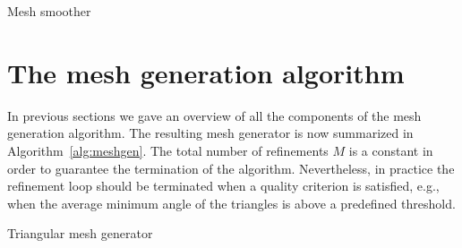 \documentclass[11pt]{article}
\begin{document}

\begin{algorithm}[H]
  \caption{Mesh smoother}
  \begin{algorithmic}[1]
    \Statex
    \EndFor
    \State {}
    \EndFunction
  \end{algorithmic}
\end{algorithm}

\section{The mesh generation algorithm}
\label{sec:orgff9b6c1}

In previous sections we gave an overview of all the components of the mesh
generation algorithm.  The resulting mesh generator is now summarized in
Algorithm~\ref{alg:meshgen}.  The total number of refinements $M$ is a constant
in order to guarantee the termination of the algorithm.  Nevertheless, in practice
the refinement loop should be terminated when a quality criterion is
satisfied, e.g., when the average minimum angle of the triangles
is above a predefined threshold.

\begin{algorithm}[H]
  \caption{Triangular mesh generator}
  \label{alg:meshgen}
  \begin{algorithmic}[1]
    \Statex
    \EndFor
    \State {}
    \EndFunction
  \end{algorithmic}
\end{algorithm}

\end{document}
